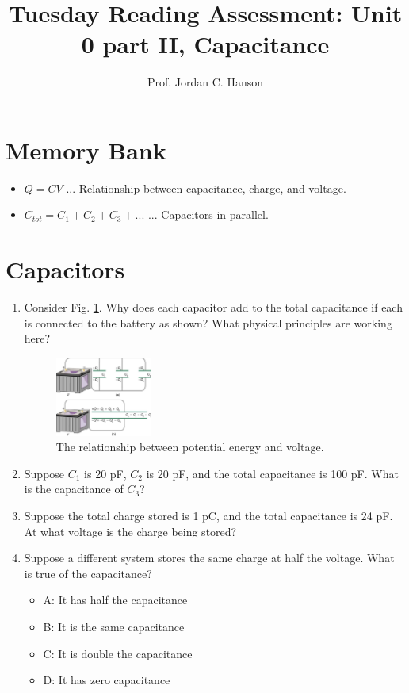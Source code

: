 \documentclass{article}
\begin{document}
\title{Tuesday Reading Assessment: Unit 0 part II, Capacitance}
\author{Prof. Jordan C. Hanson}

\maketitle

\section{Memory Bank}

\begin{itemize}
\item $Q = CV$ ... Relationship between capacitance, charge, and voltage.
\item $C_{tot} = C_1 + C_2 + C_3 + ...$ ... Capacitors in parallel.
\end{itemize}

\section{Capacitors}

\begin{enumerate}
\item Consider Fig. \ref{fig:plates}.  Why does each capacitor add to the total capacitance if each is connected to the battery as shown?  What physical principles are working here? \\ \vspace{1.5cm}
\begin{figure}[ht]
\centering
\includegraphics[width=0.3\textwidth]{cap1.jpeg}
\caption{\label{fig:plates} The relationship between potential energy and voltage.}
\end{figure}
\item Suppose $C_1$ is 20 pF, $C_2$ is 20 pF, and the total capacitance is 100 pF.  What is the capacitance of $C_3$? \\ \vspace{1cm}
\item Suppose the total charge stored is 1 pC, and the total capacitance is 24 pF.  At what voltage is the charge being stored? \\ \vspace{1cm}
\item Suppose a different system stores the same charge at half the voltage.  What is true of the capacitance?
\begin{itemize}
\item A: It has half the capacitance
\item B: It is the same capacitance
\item C: It is double the capacitance
\item D: It has zero capacitance
\end{itemize}
\end{enumerate}
\end{document}
